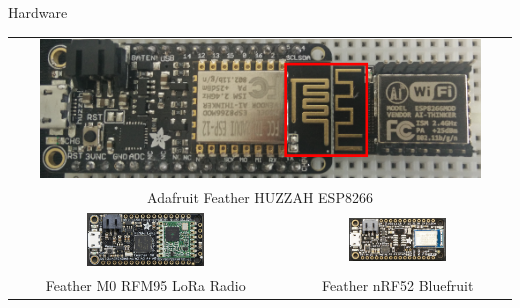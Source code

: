 \documentclass[18pt]{beamer}
\begin{document}
\begin{frame}{Hardware}
	\begin{tabular}{cc}
		\multicolumn{2}{c}{\includegraphics[width=0.9\textwidth]{images/espmodules.png}}\\
		\multicolumn{2}{c}{Adafruit Feather HUZZAH ESP8266}\\
		\includegraphics[width=0.45\textwidth]{images/loraada.png} & \includegraphics[width=0.45\textwidth]{images/nrf52ada.png}\\
		Feather M0 RFM95 LoRa Radio & Feather nRF52 Bluefruit\\
	\end{tabular}
\end{frame}
\end{document}
